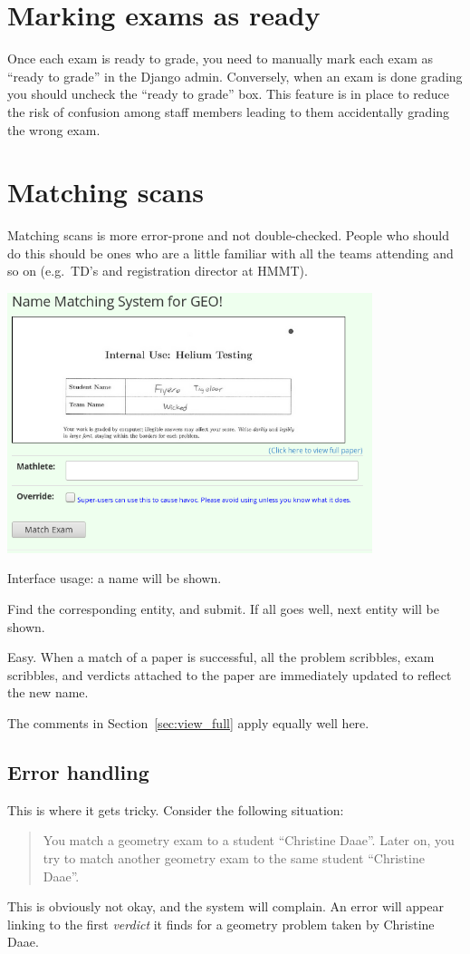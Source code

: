 \section{Marking exams as ready}
Once each exam is ready to grade,
you need to manually mark each exam as ``ready to grade''
in the Django admin.
Conversely, when an exam is done grading you should uncheck
the ``ready to grade'' box.
This feature is in place to reduce the risk of confusion among staff members
leading to them accidentally grading the wrong exam.

\section{Matching scans}
Matching scans is more error-prone and not double-checked.
People who should do this should be ones who are a little familiar with
all the teams attending and so on (e.g.\ TD's and registration director at HMMT).

\begin{center}
	\includegraphics[width=0.8\textwidth]{images/papermatch.png}
\end{center}

Interface usage: a name will be shown.
\begin{itemize}
	\ii Find the corresponding entity, and submit.
	\ii If all goes well, next entity will be shown.
\end{itemize}
Easy.
When a match of a paper is successful,
all the problem scribbles, exam scribbles, and verdicts
attached to the paper are immediately updated to reflect the new name.

The comments in Section~\ref{sec:view_full} apply equally well here.

\subsection{Error handling}
This is where it gets tricky.
Consider the following situation:
\begin{quote}
	You match a geometry exam to a student ``Christine Daae''.  
	Later on, you try to match another geometry exam
	to the same student ``Christine Daae''.
\end{quote}
This is obviously not okay, and the system will complain.
An error will appear linking to the first \emph{verdict}
it finds for a geometry problem taken by Christine Daae.

